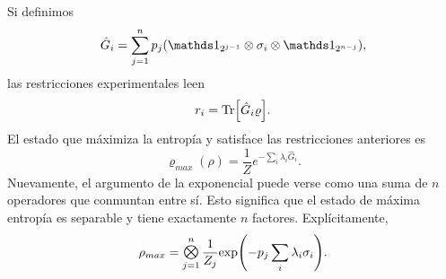 Si definimos
\begin{equation}\label{eq:GhatNM}
    \hat{G}_{i}=\sum_{j=1}^{n}p_{j}(\Id_{2^{j-1}}\otimes\sigma_{i}\otimes\Id_{2^{n-j}}),
\end{equation}
las restricciones experimentales leen
\begin{equation}\label{eq:MaxEntRestrictionsNM}
    r_{i}=\Tr[\hat{G}_{i}\varrho].
\end{equation}
El estado que máximiza la entropía y satisface las restricciones anteriores es
\begin{equation}\label{eq:MaxEntLagMultNM}
    \varrho_{max}(\rho)=\frac{1}{Z}e^{-\sum_{i}\lambda_{i}\hat{G}_{i}}.
\end{equation}
Nuevamente, el argumento de la exponencial puede verse como una suma de $n$ operadores que conmuntan entre sí. Esto significa que el estado de máxima entropía es separable y tiene exactamente $n$ factores. Explícitamente,
\begin{equation}
    \rho_{max}=\Motimes_{j=1}^{n}\frac{1}{Z_{j}}\text{exp}\qty(-p_{j}\sum_{i}\lambda_{i}\sigma_{i}).
\end{equation}

